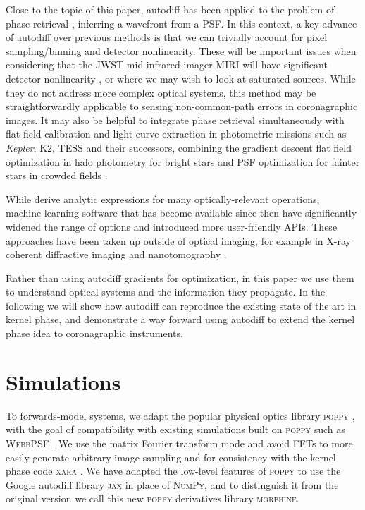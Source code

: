 \documentclass[modern]{aastex63}
\begin{document}
Close to the topic of this paper, autodiff has been applied to the problem of phase retrieval \citep{jurling14,paine19}, inferring a wavefront from a PSF. In this context, a key advance of autodiff over previous methods is that we can trivially account for pixel sampling/binning and detector nonlinearity. These will be important issues when considering that the JWST mid-infrared imager MIRI will have significant detector nonlinearity \citep{rieke15}, or where we may wish to look at saturated sources. While they do not address more complex optical systems, this method may be straightforwardly applicable to sensing non-common-path errors in coronagraphic images. It may also be helpful to integrate phase retrieval simultaneously with flat-field calibration and light curve extraction in photometric missions such as \textit{Kepler}, K2, TESS and their successors, combining the gradient descent flat field optimization in halo photometry for bright stars \citep{white17,pope19} and PSF optimization for fainter stars in crowded fields \citep[e.g.][]{eleanor,nardiello19}. 

While \citet{jurling14} derive analytic expressions for many optically-relevant operations, machine-learning software that has become available since then have significantly widened the range of options and introduced more user-friendly APIs. These approaches have been taken up outside of optical imaging, for example in X-ray coherent diffractive imaging \citep{kandel19,nashed19} and nanotomography \citep{Dueaay3700}.

Rather than using autodiff gradients for optimization, in this paper we use them to understand optical systems and the information they propagate.
In the following we will show how autodiff can reproduce the existing state of the art in kernel phase, and demonstrate a way forward using autodiff to extend the kernel phase idea to coronagraphic instruments.

\section{Simulations}
\label{sec:method}

To forwards-model systems, we adapt the popular physical optics library \textsc{poppy} \citep{poppy}, with the goal of compatibility with existing simulations built on \textsc{poppy} such as \textsc{WebbPSF} \citep{webbpsf}. We use the matrix Fourier transform mode and avoid FFTs \citep{soummer07} to more easily generate arbitrary image sampling and for consistency with the kernel phase code \textsc{xara} \citep{martinache20}. We have adapted the low-level features of \textsc{poppy} to use the Google autodiff library \textsc{jax} \citep{jax} in place of \textsc{NumPy}, and to distinguish it from the original version we call this new \textsc{poppy} derivatives library \textsc{morphine}. %
\end{document}
